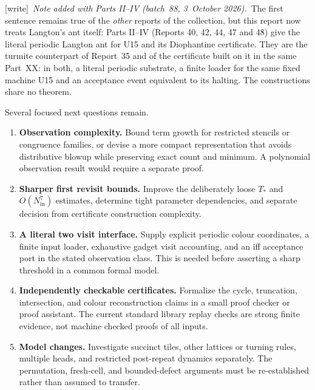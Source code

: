 \documentclass[11pt,letterpaper]{article}
\theoremstyle{definition}\newtheorem{definition}[theorem]{Definition}
\theoremstyle{remark}\newtheorem{remark}[theorem]{Remark}
\newcommand{\wtag}{\textup{[write]}}
\newcommand{\bnote}{\wtag\ \emph{Note added with Parts II--IV (batch~88, 3~October 2026).}}
\begin{document}
{\bnote\ The first sentence remains true of the \emph{other} reports of the
collection, but this report now treats Langton's ant itself: Parts II--IV
(Reports 40, 42, 44, 47 and 48) give the literal periodic Langton ant for U15
and its Diophantine certificate. They are the turmite counterpart of
Report~35 and of the certificate built on it in the same Part~XX: in both, a
literal periodic substrate, a finite loader for the same fixed machine U15
and an acceptance event equivalent to its halting. The constructions share
no theorem.
\par}

Several focused next questions remain.
\begin{enumerate}
\item \textbf{Observation complexity.} Bound term growth for restricted stencils or congruence families, or devise a more compact representation that avoids distributive blowup while preserving exact count and minimum. A polynomial observation result would require a separate proof.
\item \textbf{Sharper first revisit bounds.} Improve the deliberately loose $T_*$ and $O(N_{\mathrm{in}}^7)$ estimates, determine tight parameter dependencies, and separate decision from certificate construction complexity.
\item \textbf{A literal two visit interface.} Supply explicit periodic colour coordinates, a finite input loader, exhaustive gadget visit accounting, and an iff acceptance port in the stated observation class. This is needed before asserting a sharp threshold in a common formal model.
\item \textbf{Independently checkable certificates.} Formalize the cycle, truncation, intersection, and colour reconstruction claims in a small proof checker or proof assistant. The current standard library replay checks are strong finite evidence, not machine checked proofs of all inputs.
\item \textbf{Model changes.} Investigate succinct tiles, other lattices or turning rules, multiple heads, and restricted post-repeat dynamics separately. The permutation, fresh-cell, and bounded-defect arguments must be re-established rather than assumed to transfer.
\end{enumerate}
\end{document}

